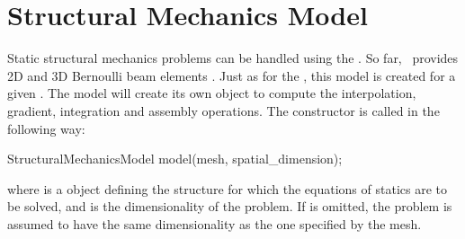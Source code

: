 \chapter{Structural  Mechanics   Model}
Static structural mechanics problems can be handled using the
.  So far, \akantu\ provides 2D and 3D
Bernoulli beam elements \cite{frey2009}.  Just as for the
, this model is created for a given
.  The model will create its own  object to
compute the interpolation, gradient, integration and assembly
operations.  The  constructor is called
in the following way:

\begin{cpp}
  StructuralMechanicsModel model(mesh, spatial_dimension);
\end{cpp}
where  is a  object defining the structure for
which the equations of statics are to be solved, and
 is the dimensionality of the problem.  If
 is omitted, the problem is assumed to have
the same dimensionality as the one specified by the mesh.




